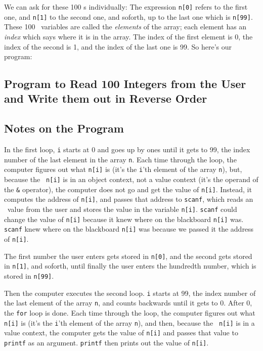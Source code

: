 We can ask for these 100 \int s individually: The expression {\tt n[0]}
refers to the first one, and {\tt n[1]} to the second one, and soforth,
up to the last one which is {\tt n[99]}.  These 100 \int\ variables are
called the {\em elements}\/ of the array; each element has an {\em
index} which says where it is in the array.  The index of the first
element is 0, the index of the second is 1, and the index of the last
one is 99.  So here's our program:

\subsection{Program to Read 100 Integers from the User and Write them out in Reverse Order}



\subsection{Notes on the Program}


In the first loop, {\tt i} starts at 0 and goes up by ones until it gets
to 99, the index number of the last element in the array {\tt n}.  Each
time through the loop, the computer figures out what {\tt n[i]} is (it's
the {\tt i}'th element of the array {\tt n}), but, because the {\tt
n[i]} is in an object context, not a value context (it's the operand of
the {\tt\&} operator), the computer does not go and get the value of
{\tt n[i]}.  Instead, it computes the address of {\tt n[i]}, and passes
that address to {\tt scanf}, which reads an \int\ value from the user
and stores the value in the variable {\tt n[i]}.  {\tt scanf} could
change the value of {\tt n[i]} because it knew where on the blackboard
{\tt n[i]} was.  {\tt scanf} knew where on the blackboard {\tt n[i]} was
because we passed it the address of {\tt n[i]}.

The first number the user enters gets stored in {\tt n[0]}, and the
second gets stored in {\tt n[1]}, and soforth, until finally the user
enters the hundredth number, which is stored in {\tt n[99]}.  

Then the computer executes the second loop.  {\tt i} starts at 99, the
index number of the last element of the array {\tt n}, and counts
backwards until it gets to 0.  After 0, the {\tt for} loop is done. Each
time through the loop, the computer figures out what {\tt n[i]} is (it's
the {\tt i}'th element of the array {\tt n}), and then, because the {\tt
n[i]} is in a value context, the computer gets the value of {\tt n[i]}
and passes that value to {\tt printf} as an argument.  {\tt printf} then
prints out the value of {\tt n[i]}.

